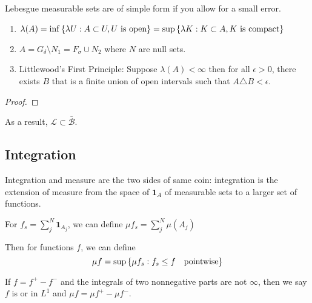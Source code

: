 \begin{thm}
    Lebesgue measurable sets are of simple form if you allow for a small error.

    \begin{enumerate}
        \item \(\lambda(A) = \inf\Bqty{\lambda U:  A \subset U, U  \text{ is open}} = \sup\Bqty{\lambda K : K \subset A, K \text{ is compact}}\)
        \item \(A = G_{\delta} \setminus N_{1}= F_{\sigma} \cup N_{2}\) where \(N\) are null sets.  
        \item Littlewood's First Principle: Suppose \(\lambda(A) < \infty\) then for all \(\epsilon > 0\), there exists \(B\) that is a finite union of open intervals such that \(A \triangle B < \epsilon\). 
    \end{enumerate}
\end{thm}
\begin{proof}
    
\end{proof}
\begin{remark}
    As a result, \(\mathcal{L} \subset \bar{\mathcal{B}}\). 
\end{remark}

\subsection{Integration}


Integration and measure are the two sides of same coin: integration is the extension of measure from the space of  \(\mathbf{1}_{A}\) of measurable sets to a larger set of functions. 

For  \(f_{s} = \sum^{N}_{j} \mathbf{1}_{A_{j}}\), we can define \(\mu f_{s} = \sum^{N}_{j} \mu(A_{j})\)


Then for  functions \(f\), we can define 
\begin{equation*}
    \mu f = \sup \Bqty{\mu f_{s} : f_{s} \leq f \quad \text{pointwise}}
\end{equation*}

If \(f = f^{+} - f^{-}\) and the integrals of two nonnegative parts are not \(\infty\), then we say \(f\) is  or in \({L}^{1}\) and \(\mu f = \mu f^{+} - \mu f^{-}\).  


